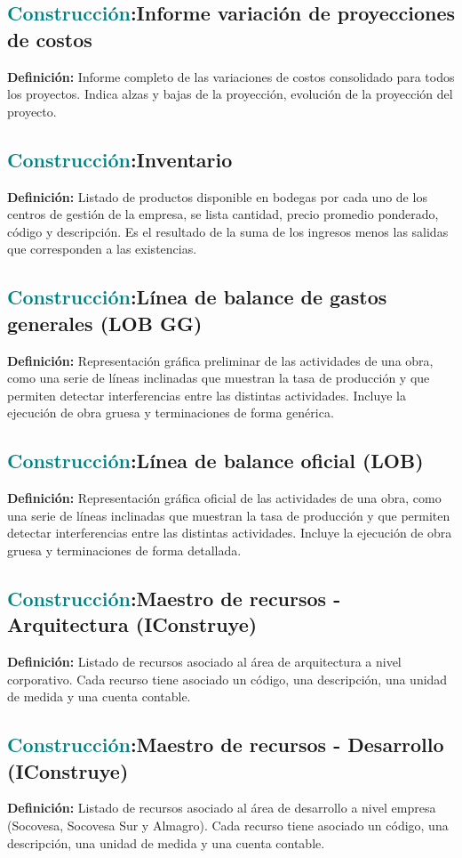 \documentclass[12pt]{article}
\begin{document}
\subsection{\textcolor{teal}{Construcción}:{Informe variación de proyecciones de costos}}
\textbf{Definición:} Informe completo de las variaciones de costos consolidado para todos los proyectos. Indica alzas y bajas de la proyección, evolución de la proyección del proyecto.
\subsection{\textcolor{teal}{Construcción}:{Inventario}}
\textbf{Definición:} Listado de productos disponible en bodegas por cada uno de los centros de gestión de la empresa, se lista cantidad, precio promedio ponderado, código y descripción. Es el resultado de la suma de los ingresos menos las salidas que corresponden a las existencias.
\subsection{\textcolor{teal}{Construcción}:{Línea de balance de gastos generales (LOB GG)}}
\textbf{Definición:} Representación gráfica preliminar de las actividades de una obra, como una serie de líneas inclinadas que muestran la tasa de producción y que permiten detectar interferencias entre las distintas actividades. Incluye la ejecución de obra gruesa y terminaciones de forma genérica.
\subsection{\textcolor{teal}{Construcción}:{Línea de balance oficial (LOB)}}
\textbf{Definición:} Representación gráfica oficial de las actividades de una obra, como una serie de líneas inclinadas que muestran la tasa de producción y que permiten detectar interferencias entre las distintas actividades. Incluye la ejecución de obra gruesa y terminaciones de forma detallada.
\subsection{\textcolor{teal}{Construcción}:{Maestro de recursos - Arquitectura (IConstruye)}}
\textbf{Definición:} Listado de recursos asociado al área de arquitectura a nivel corporativo. Cada recurso tiene asociado un código, una descripción, una unidad de medida y una cuenta contable.
\subsection{\textcolor{teal}{Construcción}:{Maestro de recursos - Desarrollo (IConstruye)}}
\textbf{Definición:} Listado de recursos asociado al área de desarrollo a nivel empresa (Socovesa, Socovesa Sur y Almagro). Cada recurso tiene asociado un código, una descripción, una unidad de medida y una cuenta contable.
\end{document}
